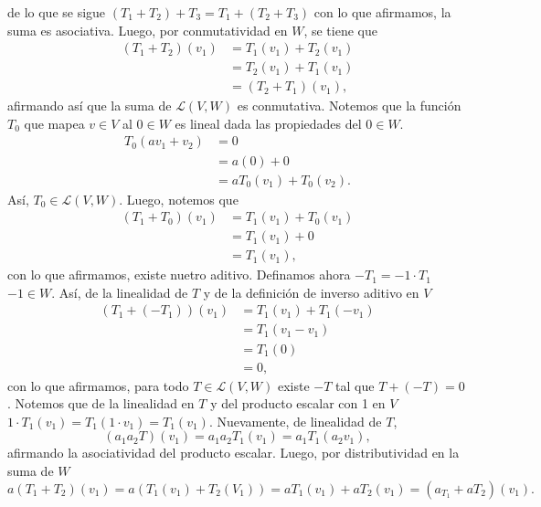 \documentclass[11pt]{scrartcl}
\begin{document}
de lo que se sigue $(T_1+T_2)+T_3=T_1+(T_2+T_3)$ con lo que afirmamos, la suma es asociativa.
Luego, por conmutatividad en $W$, se tiene que
\begin{align*}
    (T_1+T_2)(v_1)&=T_1(v_1)+T_2(v_1) \\
    &=T_2(v_1)+T_1(v_1) \\
    &=(T_2+T_1)(v_1),
\end{align*}
afirmando así que la suma de $\mathcal{L}(V,W)$ es conmutativa.
Notemos que la función $T_0$ que mapea $v\in V$ al $0 \in W$ es lineal dada las propiedades del $0 \in W$.
\begin{align*}
    T_0(av_1+v_2) &= 0 \\
    &= a(0) + 0 \\
    &= aT_0(v_1)+T_0(v_2).
\end{align*}
Así, $T_0 \in \mathcal{L}(V,W)$. Luego, notemos que
\begin{align*}
    (T_1+T_0)(v_1)&=T_1(v_1)+T_0(v_1) \\
    &=T_1(v_1) + 0 \\
    &=T_1(v_1),
\end{align*}
con lo que afirmamos, existe nuetro aditivo.
Definamos ahora $-T_1=-1\cdot T_1$ $-1 \in W$. Así, de la linealidad de $T$ y de la definición de inverso aditivo en $V$
\begin{align*}
    (T_1 + (-T_1))(v_1) &= T_1(v_1) + T_1(-v_1) \\
    &= T_1(v_1-v_1) \\
    &=T_1(0) \\
    &=0,
\end{align*} con lo que afirmamos, para todo $T \in \mathcal{L}(V,W)$ existe $-T$ tal que $T+(-T)=0$.
Notemos que de la linealidad en $T$ y del producto escalar con 1 en $V$ $1\cdot T_1(v_1)=T_1(1\cdot v_1)=T_1(v_1)$.
Nuevamente, de linealidad de $T$,
\[
(a_1a_2T)(v_1) = a_1a_2T_1(v_1) = a_1T_1(a_2v_1),
\]
afirmando la asociatividad del producto escalar. Luego, por distributividad en la suma de $W$
\[
a(T_1+T_2)(v_1)=a(T_1(v_1)+T_2(V_1))=aT_1(v_1)+aT_2(v_1)=(a_T_1+aT_2)(v_1).
\]
\end{document}
